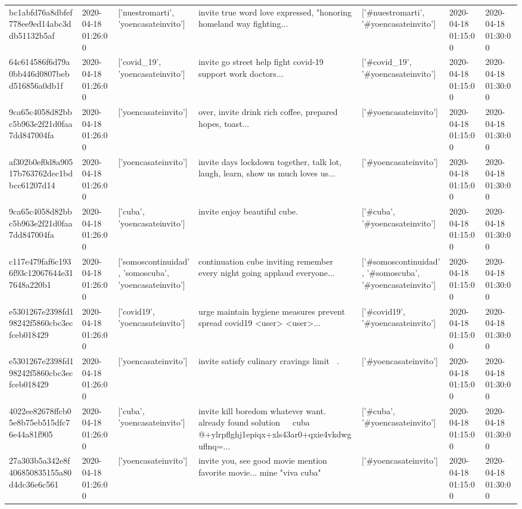 \begin{tabular}{lllllll}
bc1abfd76a8dbfef778ee9ed14abc3ddb51132b5af & 2020-04-18 01:26:00 & ['nuestromarti', 'yoencasateinvito'] & invite true word love expressed, "honoring homeland way fighting... & ['#nuestromarti', '#yoencasateinvito'] & 2020-04-18 01:15:00 & 2020-04-18 01:30:00 \\
64c614586f6d79a0bb446d0807bebd516856a0db1f & 2020-04-18 01:26:00 & ['covid_19', 'yoencasateinvito'] & invite go street help fight covid-19 support work doctors... & ['#covid_19', '#yoencasateinvito'] & 2020-04-18 01:15:00 & 2020-04-18 01:30:00 \\
9ca65c4058d82bbc5b963e2f21d0faa7dd847004fa & 2020-04-18 01:26:00 & ['yoencasateinvito'] & over, invite drink rich coffee, prepared hopes, toast... & ['#yoencasateinvito'] & 2020-04-18 01:15:00 & 2020-04-18 01:30:00 \\
af302b0ef0d8a90517b763762dec1bdbcc61207d14 & 2020-04-18 01:26:00 & ['yoencasateinvito'] & invite days lockdown together, talk lot, laugh, learn, show us much loves us... & ['#yoencasateinvito'] & 2020-04-18 01:15:00 & 2020-04-18 01:30:00 \\
9ca65c4058d82bbc5b963e2f21d0faa7dd847004fa & 2020-04-18 01:26:00 & ['cuba', 'yoencasateinvito'] & invite enjoy beautiful cube. & ['#cuba', '#yoencasateinvito'] & 2020-04-18 01:15:00 & 2020-04-18 01:30:00 \\
c117e479faf6c1936f93c12067644e317648a220b1 & 2020-04-18 01:26:00 & ['somoscontinuidad', 'somoscuba', 'yoencasateinvito'] & continuation cube inviting remember every night going applaud everyone... & ['#somoscontinuidad', '#somoscuba', '#yoencasateinvito'] & 2020-04-18 01:15:00 & 2020-04-18 01:30:00 \\
e5301267e2398fd198242f5860cbc3ecfceb018429 & 2020-04-18 01:26:00 & ['covid19', 'yoencasateinvito'] & urge maintain hygiene measures prevent spread covid19 <user> <user>... & ['#covid19', '#yoencasateinvito'] & 2020-04-18 01:15:00 & 2020-04-18 01:30:00 \\
e5301267e2398fd198242f5860cbc3ecfceb018429 & 2020-04-18 01:26:00 & ['yoencasateinvito'] & invite satisfy culinary cravings limit 🤣🤣. & ['#yoencasateinvito'] & 2020-04-18 01:15:00 & 2020-04-18 01:30:00 \\
4022ee82678ffcb05e8b75eb515dfc76e44a81f905 & 2020-04-18 01:26:00 & ['cuba', 'yoencasateinvito'] & invite kill boredom whatever want. already found solution 🤣🤣🤣 cuba @+ylrpflghj1epiqx+xls43ar0+qxie4vkdwguflnq=... & ['#cuba', '#yoencasateinvito'] & 2020-04-18 01:15:00 & 2020-04-18 01:30:00 \\
27a303b5a342e8f406850835155a80d4dc36e6c561 & 2020-04-18 01:26:00 & ['yoencasateinvito'] & invite you, see good movie mention favorite movie... mine "viva cuba" & ['#yoencasateinvito'] & 2020-04-18 01:15:00 & 2020-04-18 01:30:00 \\

\end{tabular}
